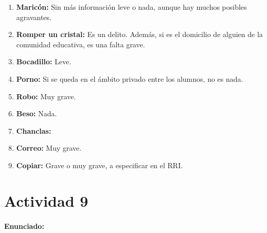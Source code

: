 {\begin{enumerate}
	\item \textbf{Maricón: } Sin más información leve o nada, aunque hay muchos posibles agravantes.

	\item \textbf{Romper un cristal: } Es un delito.
 Además, si es el domicilio de alguien de la comunidad educativa, es una falta grave.
 
	\item \textbf{Bocadillo: } Leve.

	\item \textbf{Porno: } Si se queda en el ámbito privado entre los alumnos, no es nada.

	\item \textbf{Robo: } Muy grave.

	\item \textbf{Beso: } Nada.

	\item \textbf{Chanclas: } 
	\item \textbf{Correo: } Muy grave.

	\item \textbf{Copiar: } Grave o muy grave, a especificar en el RRI.

\end{enumerate}


\newpage
\section*{Actividad 9}
\paragraph{Enunciado: }

}

